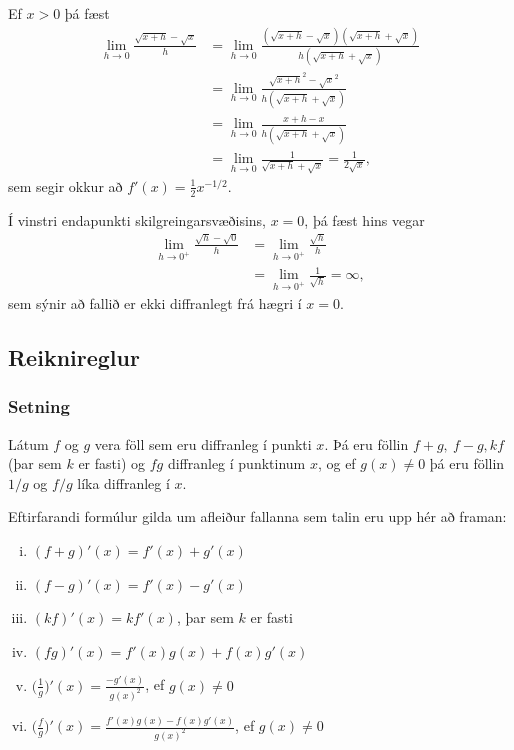 \documentclass[icelandic,a4paper,12pt]{article}
\begin{document}
Ef $x>0$ þá fæst
\begin{align*}
  \lim_{h\to 0} \frac{\sqrt{x+h}-\sqrt{x}}h &= 
  \lim_{h\to 0} \frac{(\sqrt{x+h}-\sqrt{x})(\sqrt{x+h}+\sqrt{x})}{h(\sqrt{x+h}+\sqrt{x})}\\ 
  &= \lim_{h\to 0} \frac{\sqrt{x+h}^2-\sqrt{x}^2}{h(\sqrt{x+h}+\sqrt{x})}\\
  &= \lim_{h\to 0} \frac{x+h-x}{h(\sqrt{x+h}+\sqrt{x})}\\
  &= \lim_{h\to 0} \frac{1}{\sqrt{x+h}+\sqrt{x}} = \frac{1}{2\sqrt{x}},
\end{align*}
sem segir okkur að $f'(x) = \frac 12 x^{-1/2}$.

Í vinstri endapunkti skilgreingarsvæðisins, $x=0$, þá fæst hins vegar
\begin{align*}
  \lim_{h\to 0^+} \frac{\sqrt{h}-\sqrt{0}}h &= 
  \lim_{h\to 0^+} \frac{\sqrt{h}}h\\
  &= \lim_{h\to 0^+} \frac{1}{\sqrt{h}} = \infty,
\end{align*}
sem sýnir að fallið er ekki diffranlegt frá hægri í $x=0$.

\subsection{Reiknireglur}
\subsubsection{Setning}\label{setn:diffreglur}
Látum $f$ og $g$ vera föll sem eru diffranleg í punkti $x$.  Þá eru
föllin $f+g,\ f-g, kf$ (þar sem $k$ er fasti) og $fg$
diffranleg í punktinum $x$, og ef $g(x)\neq 0$ þá eru föllin
$1/g$ og $f/g$ líka diffranleg í $x$.
\pause

Eftirfarandi formúlur gilda um afleiður fallanna sem talin eru upp hér að
framan: 
\begin{enumerate}[(i)]
\item $(f+g)'(x)=f'(x)+g'(x)$ \pause
\item $(f-g)'(x)=f'(x)-g'(x)$\pause
\item $(kf)'(x)=kf'(x)$, þar sem $k$ er fasti\pause
\item $(fg)'(x)=f'(x)g(x)+f(x)g'(x)$\pause
\item $\displaystyle\Bigg(\frac{1}{g}\Bigg)'(x)=\frac{-g'(x)}{g(x)^2}$,  ef
  $g(x)\neq 0$\pause
\item $\displaystyle\Bigg(\frac{f}{g}\Bigg)'(x)=
\frac{f'(x)g(x)-f(x)g'(x)}{g(x)^2}$, ef
  $g(x)\neq 0$
\end{enumerate}
\end{document}
